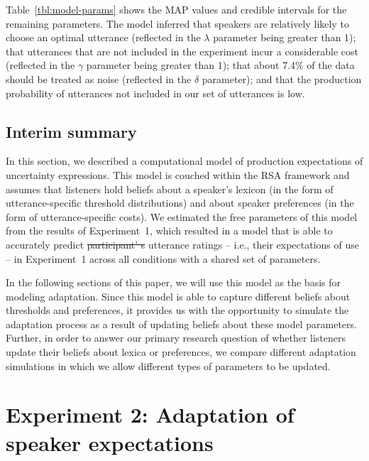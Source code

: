 \documentclass[man, floatsintext]{apa6}
\newcommand{\tableref}[1]{Table~\ref{#1}}
\providecommand{\DIFadd}[1]{{\protect\color{blue}\uwave{#1}}} %
\providecommand{\DIFdel}[1]{{\protect\color{red}\sout{#1}}}                      %
\providecommand{\DIFaddbegin}{} %
\providecommand{\DIFaddend}{} %
\providecommand{\DIFdelbegin}{} %
\providecommand{\DIFdelend}{} %
\newcommand{\DIFscaledelfig}{0.5}
\newlength{\DIFdelgraphicswidth} %
\newlength{\DIFdelgraphicsheight} %
\newcommand{\DIFaddincludegraphics}[2][]{{\color{blue}\fbox{\DIFOincludegraphics[#1]{#2}}}} %
\newcommand{\DIFdelincludegraphics}[2][]{%
\sbox{\DIFdelgraphicsbox}{\DIFOincludegraphics[#1]{#2}}%
\settoboxwidth{\DIFdelgraphicswidth}{\DIFdelgraphicsbox} %
\settoboxtotalheight{\DIFdelgraphicsheight}{\DIFdelgraphicsbox} %
\scalebox{\DIFscaledelfig}{%
\parbox[b]{\DIFdelgraphicswidth}{\usebox{\DIFdelgraphicsbox}\\[-\baselineskip] \rule{\DIFdelgraphicswidth}{0em}}\llap{\resizebox{\DIFdelgraphicswidth}{\DIFdelgraphicsheight}{%
\setlength{\unitlength}{\DIFdelgraphicswidth}%
\begin{picture}(1,1)%
\thicklines\linethickness{2pt} %
{\color[rgb]{1,0,0}\put(0,0){\framebox(1,1){}}}%
{\color[rgb]{1,0,0}\put(0,0){\line( 1,1){1}}}%
{\color[rgb]{1,0,0}\put(0,1){\line(1,-1){1}}}%
\end{picture}%
}\hspace*{3pt}}} %
} %
\DeclareRobustCommand{\DIFaddbegin}{\DIFOaddbegin \let\includegraphics\DIFaddincludegraphics} %
\DeclareRobustCommand{\DIFaddend}{\DIFOaddend \let\includegraphics\DIFOincludegraphics} %
\DeclareRobustCommand{\DIFdelbegin}{\DIFOdelbegin \let\includegraphics\DIFdelincludegraphics} %
\DeclareRobustCommand{\DIFdelend}{\DIFOaddend \let\includegraphics\DIFOincludegraphics} %
\begin{document}
  \tableref{tbl:model-params} shows the MAP values and credible intervals for the remaining parameters. The model inferred that speakers
  are relatively likely to choose an optimal utterance (reflected in the $\lambda$ parameter being
  greater than 1); that utterances that are not included in the experiment incur a considerable cost  (reflected in the $\gamma$ parameter being greater than 1); that about 7.4\%
  of the data should be treated as noise (reflected in the $\delta$ parameter); and that the production probability of utterances not included in our set of utterances is low. 

 
 \subsection{Interim summary}

 In this section, we described a computational model of production expectations of uncertainty expressions. This model
 is couched within the RSA framework and assumes that listeners hold beliefs about a speaker's lexicon (in the form
 of utterance-specific threshold distributions) and about speaker preferences (in the form of utterance-specific costs). We estimated 
 the free parameters of this model from the results of Experiment~1, which resulted in a model that is able to accurately predict
 \DIFdelbegin \DIFdel{participant' s }\DIFdelend \DIFaddbegin \DIFadd{participants' }\DIFaddend utterance ratings -- i.e., their expectations of use --  in Experiment~1 across all conditions with a shared set of parameters.

 In the following sections of this paper, we will use this model as the basis for modeling adaptation. Since this model
 is able to capture different beliefs about thresholds and preferences, it provides us with the opportunity to simulate 
 the adaptation process as a result of updating beliefs about these model parameters. Further, in order to answer
 our primary research question of whether listeners update their beliefs about lexica or preferences, we compare
 different adaptation simulations in which we allow different types of parameters to be updated.





\section{Experiment 2: Adaptation of speaker expectations}
\label{sec:exp-prod-adaptation}
\end{document}
